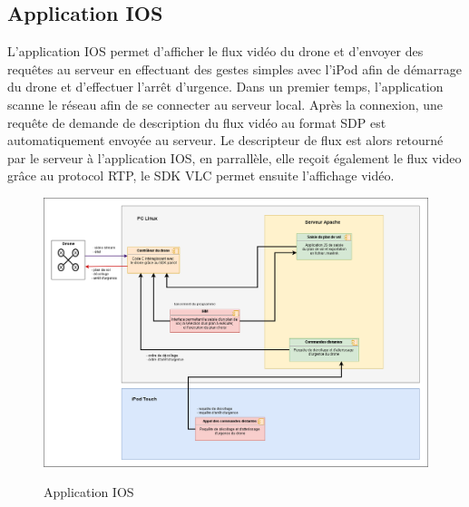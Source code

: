 \documentclass{article}
\begin{document}
     \subsection{Application IOS}
     L'application IOS permet d'afficher le flux vidéo du drone et d'envoyer des requêtes au serveur en effectuant des gestes simples avec l'iPod afin de démarrage du drone et d'effectuer l'arrêt d'urgence.
     \vspace{0.2cm}
     \newline
     Dans un premier temps, l'application scanne le réseau afin de se connecter au serveur local.
     Après la connexion, une requête de demande de description du flux vidéo au format SDP est automatiquement envoyée au serveur.
     \vspace{0.2cm}
     \newline
     Le descripteur de flux est alors retourné par le serveur à l'application IOS, en parrallèle, elle reçoit également le flux video grâce au protocol RTP, le SDK VLC permet ensuite l'affichage vidéo.
        \vspace*{0.3cm}
	    \begin{center}
		\begin{figure}[!h]
		\includegraphics[scale=0.4]{03_archi_logicielle_iPod.png}\\
		\caption{Application IOS}
		\end{figure}
        \end{center}
        
    \newpage
	
\end{document}
